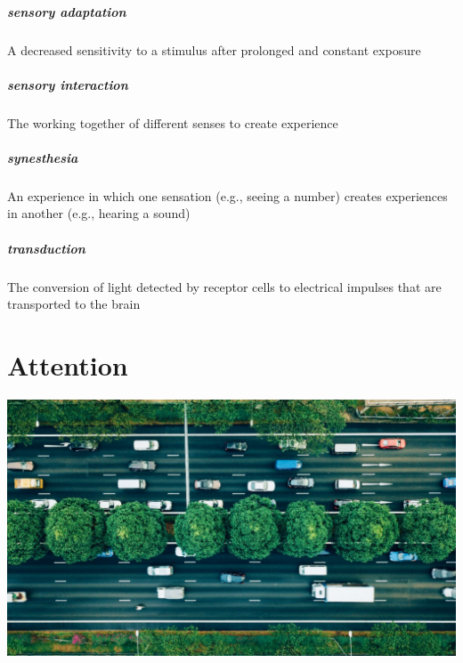 \documentclass[
]{krantz}
\begin{document}
\hypertarget{sensory-adaptation}{%
\paragraph*{sensory adaptation}\label{sensory-adaptation}}

A decreased sensitivity to a stimulus after prolonged and constant exposure

\hypertarget{sensory-interaction}{%
\paragraph*{sensory interaction}\label{sensory-interaction}}

The working together of different senses to create experience

\hypertarget{synesthesia}{%
\paragraph*{synesthesia}\label{synesthesia}}

An experience in which one sensation (e.g., seeing a number) creates experiences in another (e.g., hearing a sound)

\hypertarget{transduction}{%
\paragraph*{transduction}\label{transduction}}

The conversion of light detected by receptor cells to electrical impulses that are transported to the brain

\hypertarget{attention}{%
\chapter{Attention}\label{attention}}

\begin{center}\includegraphics[width=1\linewidth]{images/3_attention/attnhead} \end{center}
\end{document}
